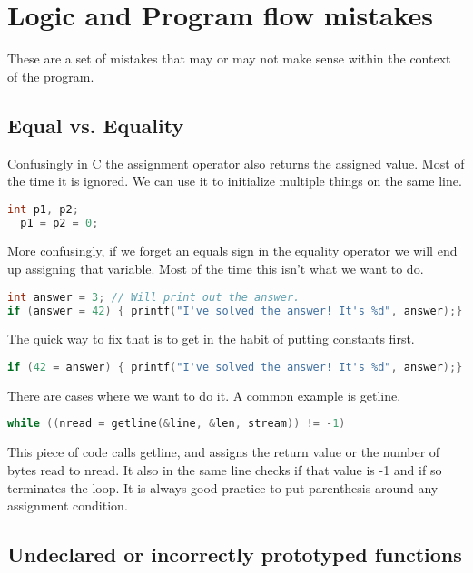 \section{Logic and Program flow mistakes}

These are a set of mistakes that may or may not make sense within the context of the program.

\subsection{Equal vs. Equality}

Confusingly in C the assignment operator also returns the assigned value. Most of the time it is ignored. We can use it to initialize multiple things on the same line.


\begin{lstlisting}[language=C]
  int p1, p2;
  p1 = p2 = 0;
\end{lstlisting}

More confusingly, if we forget an equals sign in the equality operator we will end up assigning that variable. Most of the time this isn't what we want to do.

\begin{lstlisting}[language=C]
int answer = 3; // Will print out the answer.
if (answer = 42) { printf("I've solved the answer! It's %d", answer);}
\end{lstlisting}

The quick way to fix that is to get in the habit of putting constants first.

\begin{lstlisting}[language=C]
if (42 = answer) { printf("I've solved the answer! It's %d", answer);}
\end{lstlisting}

There are cases where we want to do it. A common example is getline.

\begin{lstlisting}[language=C]
while ((nread = getline(&line, &len, stream)) != -1)
\end{lstlisting}

This piece of code calls getline, and assigns the return value or the number of bytes read to nread. It also in the same line checks if that value is -1 and if so terminates the loop.
It is always good practice to put parenthesis around any assignment condition.

\subsection{Undeclared or incorrectly prototyped functions}

